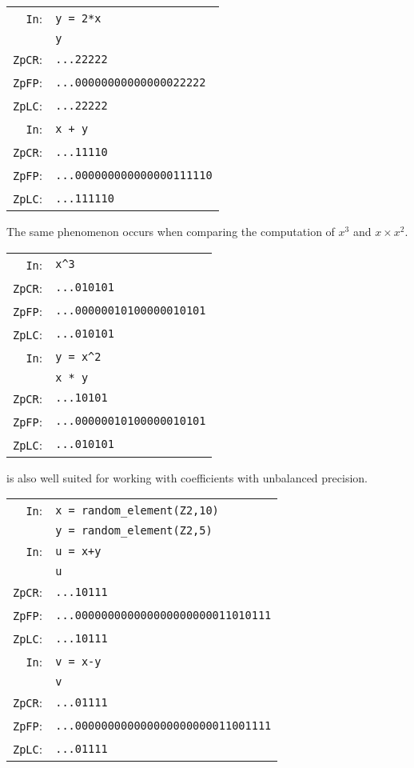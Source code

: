 \documentclass[sigconf]{acmart}
\newcommand{\ZpL}{\text{\rm \tt ZpL}\xspace}
\newcommand{\cIn}{{\color{blue} \tt \phantom{Zp}In}:}
\newcommand{\cZpCR}{{\color{red} \tt ZpCR}:}
\newcommand{\cZpFP}{{\color{red} \tt ZpFP}:}
\newcommand{\cZpLC}{{\color{red} \tt ZpLC}:}
\theoremstyle{definition}
\begin{document}
\begin{tabular}{rl}
\cIn
 & \verb?y = 2*x? \\
 & \verb?y? \\
\cZpCR
 & \verb?...22222? \\
\cZpFP
 & \verb?...00000000000000022222? \\
\cZpLC
 & \verb?...22222? \\
\cIn
 & \verb?x + y? \\
\cZpCR
 & \verb?...11110? \\
\cZpFP
 & \verb?...000000000000000111110? \\
\cZpLC
 & \verb?...111110? \\
\end{tabular}

The same phenomenon occurs when comparing the computation
of $x^3$ and $x \times x^2.$

\begin{tabular}{rl}
\cIn
 & \verb?x^3? \\
\cZpCR
 & \verb?...010101? \\
\cZpFP
 & \verb?...00000010100000010101? \\
\cZpLC
 & \verb?...010101? \\
\cIn
 & \verb?y = x^2? \\
 & \verb?x * y? \\
\cZpCR
 & \verb?...10101? \\
\cZpFP
 & \verb?...00000010100000010101? \\
\cZpLC
 & \verb?...010101? \\

\end{tabular}

\ZpL is also well suited for working with coefficients 
with unbalanced precision.

\begin{tabular}{rl}
\cIn
 & \verb?x = random_element(Z2,10)? \\
 & \verb?y = random_element(Z2,5)? \\
\cIn
 & \verb?u = x+y? \\
 & \verb?u? \\
\cZpCR
 & \verb?...10111? \\
\cZpFP
 & \verb?...000000000000000000000011010111? \\
\cZpLC
 & \verb?...10111? \\
\cIn
 & \verb?v = x-y? \\
 & \verb?v? \\
\cZpCR
 & \verb?...01111? \\
\cZpFP
 & \verb?...000000000000000000000011001111? \\
\cZpLC
 & \verb?...01111? \\
\end{tabular}
\end{document}
